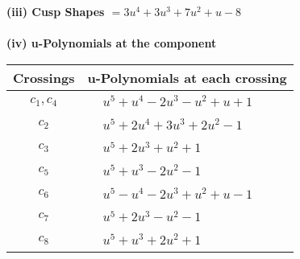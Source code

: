 \documentclass[1p]{elsarticle_modified}
\theoremstyle{definition}
\begin{document}
\flushleft \textbf{(iii) Cusp Shapes $= 3 u^4+3 u^3+7 u^2+u-8$}\\~\\
\newpage\renewcommand{\arraystretch}{1}
\flushleft \textbf{(iv) u-Polynomials at the component}\newline \\
\begin{tabular}{m{50pt}|m{274pt}}
Crossings & \hspace{64pt}u-Polynomials at each crossing \\
\hline $$\begin{aligned}c_{1},c_{4}\end{aligned}$$&$\begin{aligned}
&u^5+u^4-2 u^3- u^2+u+1
\end{aligned}$\\
\hline $$\begin{aligned}c_{2}\end{aligned}$$&$\begin{aligned}
&u^5+2 u^4+3 u^3+2 u^2-1
\end{aligned}$\\
\hline $$\begin{aligned}c_{3}\end{aligned}$$&$\begin{aligned}
&u^5+2 u^3+u^2+1
\end{aligned}$\\
\hline $$\begin{aligned}c_{5}\end{aligned}$$&$\begin{aligned}
&u^5+u^3-2 u^2-1
\end{aligned}$\\
\hline $$\begin{aligned}c_{6}\end{aligned}$$&$\begin{aligned}
&u^5- u^4-2 u^3+u^2+u-1
\end{aligned}$\\
\hline $$\begin{aligned}c_{7}\end{aligned}$$&$\begin{aligned}
&u^5+2 u^3- u^2-1
\end{aligned}$\\
\hline $$\begin{aligned}c_{8}\end{aligned}$$&$\begin{aligned}
&u^5+u^3+2 u^2+1
\end{aligned}$\\

\end{tabular}
\end{document}
